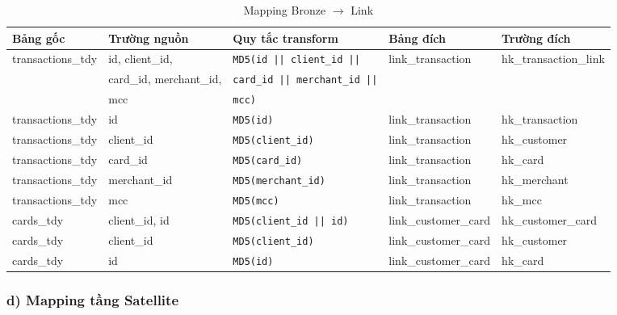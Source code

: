 \begin{table}[H]
\centering
\footnotesize

\begin{tabular}{lllll}
\hline
\textbf{Bảng gốc} & \textbf{Trường nguồn} & \textbf{Quy tắc transform} & \textbf{Bảng đích} & \textbf{Trường đích} \\
\hline
transactions\_tdy & id, client\_id,        & \texttt{MD5(id || client\_id ||}     & link\_transaction & hk\_transaction\_link \\
                  & card\_id, merchant\_id, & \texttt{card\_id || merchant\_id ||} &                   &                       \\
                  & mcc                    & \texttt{mcc)}                         &                   &                       \\
transactions\_tdy & id                     & \texttt{MD5(id)}                      & link\_transaction & hk\_transaction       \\
transactions\_tdy & client\_id             & \texttt{MD5(client\_id)}              & link\_transaction & hk\_customer          \\
transactions\_tdy & card\_id               & \texttt{MD5(card\_id)}                & link\_transaction & hk\_card              \\
transactions\_tdy & merchant\_id           & \texttt{MD5(merchant\_id)}            & link\_transaction & hk\_merchant          \\
transactions\_tdy & mcc                    & \texttt{MD5(mcc)}                     & link\_transaction & hk\_mcc               \\
\hline
cards\_tdy        & client\_id, id         & \texttt{MD5(client\_id || id)}  & link\_customer\_card & hk\_customer\_card \\
cards\_tdy        & client\_id             & \texttt{MD5(client\_id)}        & link\_customer\_card & hk\_customer       \\
cards\_tdy        & id                     & \texttt{MD5(id)}                & link\_customer\_card & hk\_card           \\
\hline
\end{tabular}
\caption{Mapping Bronze $\rightarrow$ Link}
\end{table}


\subsubsection*{d) Mapping tầng Satellite}

